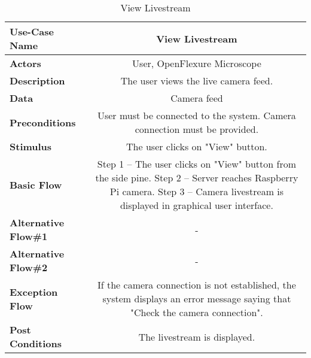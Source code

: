 \begin{table}[H]
     \centering
     \begin{tabular}{|l|C|}
         \hline
          \textbf{Use-Case Name} & View Livestream \\
         \hline
          \textbf{Actors} & User, OpenFlexure Microscope \\ 
         \hline
          \textbf{Description} & The user views the live camera feed. \\ 
         \hline
          \textbf{Data} & Camera feed\\ 
         \hline
          \textbf{Preconditions} & 
          User must be connected to the system. \newline
          Camera connection must be provided. \\
         \hline
          \textbf{Stimulus} & The user clicks on "View" button. \\ 
         \hline
          \textbf{Basic Flow} & 
          Step 1 -- The user clicks on "View" button from the side pine. \newline
		  Step 2 -- Server reaches Raspberry Pi camera. \newline
		  Step 3 -- Camera livestream is displayed in graphical user interface. \\
         \hline
          \textbf{Alternative Flow\#1} & - \\
         \hline
          \textbf{Alternative Flow\#2} & - \\
         \hline
          \textbf{Exception Flow} & If the camera connection is not established, the system displays an error message saying that "Check the camera connection".\\
         \hline
          \textbf{Post Conditions} & The livestream is displayed. \\ 
         \hline
     \end{tabular}
     \caption{View Livestream}
     \label{tab:view_livestream}
 \end{table}